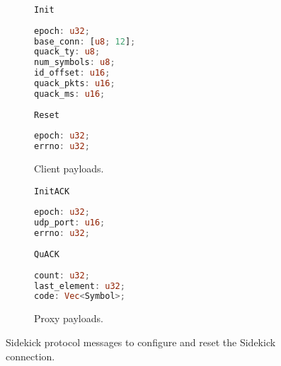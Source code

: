 \begin{figure}[t]
    \begin{subfigure}[b]{0.48\linewidth}
        \begin{protopayload}{\texttt{Init}}
            \begin{lstlisting}[language=Rust]
epoch: u32;
base_conn: [u8; 12];
quack_ty: u8;
num_symbols: u8;
id_offset: u16;
quack_pkts: u16;
quack_ms: u16;
            \end{lstlisting}
        \end{protopayload}
        \begin{protopayload}{\texttt{Reset}}
            \begin{lstlisting}[language=Rust]
epoch: u32;
errno: u32;
            \end{lstlisting}
        \end{protopayload}
        \caption{Client payloads.}
        \label{fig:sidekick:payloads:client}
    \end{subfigure}
    \hfill
    \begin{subfigure}[b]{0.48\linewidth}
        \begin{protopayload}{\texttt{InitACK}}
            \begin{lstlisting}[language=Rust]
epoch: u32;
udp_port: u16;
errno: u32;
            \end{lstlisting}
        \end{protopayload}
        \begin{protopayload}{\texttt{QuACK}}
            \begin{lstlisting}[language=Rust]
count: u32;
last_element: u32;
code: Vec<Symbol>;
            \end{lstlisting}
        \end{protopayload}
        \caption{Proxy payloads.}
        \label{fig:sidekick:payloads:proxy}
    \end{subfigure}
  \caption{Sidekick protocol messages to configure and reset the Sidekick
  connection.}
  \label{fig:sidekick:payloads}
\end{figure}

